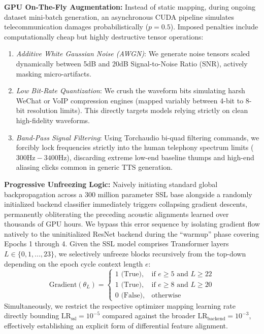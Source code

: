 \documentclass[10pt, twocolumn]{article}
\begin{document}
\textbf{GPU On-The-Fly Augmentation:} Instead of static mapping, during ongoing dataset mini-batch generation, an asynchronous CUDA pipeline simulates telecommunication damages probabilistically ($p=0.5$). Imposed penalties include computationally cheap but highly destructive tensor operations:
\begin{enumerate}
    \item \textit{Additive White Gaussian Noise (AWGN)}: We generate noise tensors scaled dynamically between 5dB and 20dB Signal-to-Noise Ratio (SNR), actively masking micro-artifacts.
    \item \textit{Low Bit-Rate Quantization}: We crush the waveform bits simulating harsh WeChat or VoIP compression engines (mapped variably between 4-bit to 8-bit resolution limits). This directly targets models relying strictly on clean high-fidelity waveforms.
    \item \textit{Band-Pass Signal Filtering}: Using Torchaudio bi-quad filtering commands, we forcibly lock frequencies strictly into the human telephony spectrum limits ($300\text{Hz} - 3400\text{Hz}$), discarding extreme low-end baseline thumps and high-end aliasing clicks common in generic TTS generation.
\end{enumerate}

\textbf{Progressive Unfreezing Logic:} Naively initiating standard global backpropagation across a 300 million parameter SSL base alongside a randomly initialized backend classifier immediately triggers collapsing gradient descents, permanently obliterating the preceding acoustic alignments learned over thousands of GPU hours. We bypass this error sequence by isolating gradient flow natively to the uninitialized ResNet backend during the ``warmup'' phase covering Epochs 1 through 4. Given the SSL model comprises Transformer layers $L \in \{0, 1, ..., 23\}$, we selectively unfreeze blocks recursively from the top-down depending on the epoch cycle context length $e$: 
$$ \text{Gradient}(\theta_L) = 
\begin{cases} 
1 \text{ (True)}, & \text{if } e \ge 5 \text{ and } L \ge 22 \\
1 \text{ (True)}, & \text{if } e \ge 8 \text{ and } L \ge 20 \\
0 \text{ (False)}, & \text{otherwise}
\end{cases} $$
Simultaneously, we restrict the respective optimizer mapping learning rate directly bounding $\text{LR}_{\text{ssl}} = 10^{-5}$ compared against the broader $\text{LR}_{\text{backend}} = 10^{-3}$, effectively establishing an explicit form of differential feature alignment.
\end{document}
